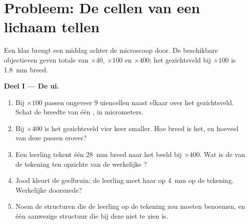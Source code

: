 \section{Probleem: De cellen van een lichaam tellen}

\begin{problem}
\label{pb:g10:cells-common-unit:1}
Een klas brengt een middag achter de microscoop door. De beschikbare
objectieven geven totale  van $\times 40$, $\times 100$ en
$\times 400$; het gezichtsveld bij $\times 100$ is \qty{1.8}{mm} breed.

\medskip
\noindent\textbf{Deel I --- De ui.}
\begin{enumerate}
  \item Bij $\times 100$ passen ongeveer 9 uiencellen naast elkaar over
        het gezichtsveld. Schat de breedte van één , in micrometers.
  \item Bij $\times 400$ is het gezichtsveld vier keer smaller. Hoe
        breed is het, en hoeveel van deze  passen erover?
  \item Een leerling tekent één  \qty{28}{mm} breed naar het beeld
        bij $\times 400$. Wat is de  van de tekening ten
        opzichte van de werkelijke ?
  \item Jood kleurt de  geelbruin; de leerling meet haar op
        \qty{4}{mm} op de tekening. Werkelijke doorsnede?
  \item Noem de structuren die de leerling op de tekening zou moeten
        benoemen, en één aanwezige structuur die bij deze 
        niet te zien is.
\end{enumerate}


\end{problem}
